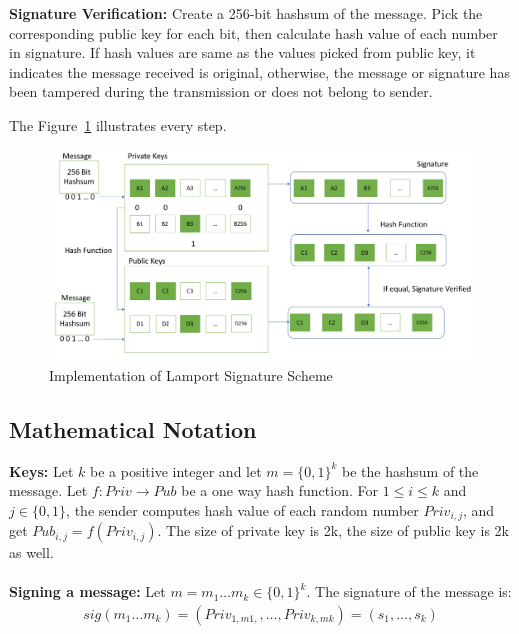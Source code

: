\documentclass[10pt,sigconf]{acmart}
\begin{document}
\noindent\textbf{Signature Verification:} \quad Create a 256-bit hashsum of the message. Pick the corresponding public key for each bit, then calculate hash value of each number in signature. If hash values are same as the values picked from public key, it indicates the message received is original, otherwise, the message or signature has been tampered during the transmission or does not belong to sender. 
\vspace{0.5em}

\noindent The Figure~\ref{fig:Lamport_Implementation_Details} illustrates every step.

\begin{figure}[H]
\centering
\includegraphics[scale=0.18]{Lamport_Implementation_Details.png}
\caption{\small{Implementation of Lamport Signature Scheme}}
\label{fig:Lamport_Implementation_Details}
\end{figure}


\subsection{Mathematical Notation}

\textbf{Keys:} \quad Let $k$ be a positive integer and let $m = \{0,1\}^k$ be the hashsum of the message. Let $f:Priv \to Pub$ be a one way hash function. For $1 \leq i \leq k$ and $j \in \{0,1\}$, the sender computes hash value of each random number $Priv_{i,j}$, and get $Pub_{i,j} = f (Priv_{i,j})$. The size of private key is 2k, the size of public key is 2k as well.
\\
\\
\noindent \textbf{Signing a message:} \quad Let $m = m_1 \dots m_k \in \{0,1\}^k$. The signature of the message is:
\begin{align*}
sig(m_1 \dots m_k) = (Priv_{1,m1,}, \dots , Priv_{k,mk}) = (s_1, \dots, s_k)    
\end{align*}
\end{document}
